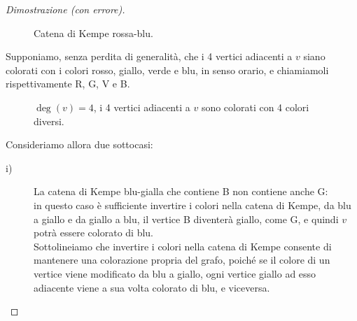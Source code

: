 \documentclass[a4paper,12pt,titlepage]{report}
\begin{document}
\begin{proof}[Dimostrazione (con errore)]
\begin{enumerate}
\begin{figure}[h]
        		\vspace{0.5cm}
        		\caption{Catena di Kempe rossa-blu.}
        	\end{figure}
        	Supponiamo, senza perdita di generalità, che i 4 vertici adiacenti a $v$ siano colorati con i colori rosso, giallo, verde e blu, in senso orario, e chiamiamoli rispettivamente R, G, V e B.
        	\begin{figure}[H]
        		\centering
        		\vspace{0.5cm}
        		\caption{$\deg(v) = 4$, i 4 vertici adiacenti a $v$ sono colorati con 4 colori diversi.}
        	\end{figure}
        	Consideriamo allora due sottocasi:
        	\begin{description}
        		\item[i)] La catena di Kempe blu-gialla che contiene B non contiene anche G:
        		\\in questo caso è sufficiente invertire i colori nella catena di Kempe, da blu a giallo e da giallo a blu, il vertice B diventerà giallo, come G, e quindi $v$ potrà essere colorato di blu.
        		\\Sottolineiamo che invertire i colori nella catena di Kempe consente di mantenere una colorazione propria del grafo, poiché se il colore di un vertice viene modificato da blu a giallo, ogni vertice giallo ad esso adiacente viene a sua volta colorato di blu, e viceversa.
        			\begin{figure}[h]
        			\centering
\end{figure}
\end{description}
\end{enumerate}
\end{proof}
\end{document}
